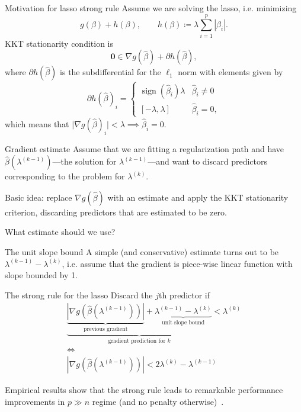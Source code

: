 \documentclass[10pt,ignorenonframetext]{beamer}
\DeclareMathOperator{\sign}{sign}
\begin{document}
\begin{frame}{Motivation for lasso strong rule}
  Assume we are solving the lasso, i.e. minimizing \[g(\beta) + h(\beta), \qquad h(\beta) \coloneqq \lambda \sum_{i=1}^p |\beta_i|.\]
  KKT stationarity condition is \[\boldsymbol{0} \in \nabla g(\hat\beta) + \partial h(\hat\beta),\] where \(\partial h(\hat\beta)\) is the subdifferential for the \(\ell_1\) norm with
  elements given by
  \[
    \partial h(\hat\beta)_i =
    \begin{cases}
      \sign(\hat\beta_i)\lambda & \hat\beta_i \neq 0 \\
      [-\lambda, \lambda]       & \hat\beta_i = 0,
    \end{cases}
  \]
  which means that \(\lvert \nabla g(\hat\beta)_i\rvert < \lambda \implies \hat\beta_i = 0\).
\end{frame}

\begin{frame}{Gradient estimate}
  Assume that we are fitting a regularization \alert{path} and have
  \(\hat\beta(\lambda^{(k-1)})\)---the solution for \(\lambda^{(k-1)}\)---and want
  to discard predictors corresponding to the problem for \(\lambda^{(k)}\).\medskip

  Basic idea: replace \(\nabla g(\hat\beta)\) with an estimate and apply the KKT stationarity
  criterion, discarding predictors that are estimated to be zero.\medskip

  What estimate should we use?\medskip
\end{frame}

\begin{frame}{The unit slope bound}
  A simple (and conservative) estimate turns out to be \(\lambda^{(k-1)} - \lambda^{(k)}\),
  i.e. assume that the gradient is piece-wise linear function with slope bounded by 1.

  \centering
  
\end{frame}

\begin{frame}{The strong rule for the lasso}
  Discard the \(j\)th predictor if
  \[
    \begin{gathered}
      \underbrace{\underbrace{\left| \nabla g\left(\hat\beta(\lambda^{(k-1)})\right) \right|}_\text{previous gradient} + \underbrace{\lambda^{(k-1)} - \lambda^{(k)}}_\text{unit slope bound}}_\text{gradient prediction for \(k\)} < \lambda^{(k)}\\
      \iff\\
      \left| \nabla g\left(\hat\beta(\lambda^{(k-1)})\right) \right| < 2\lambda^{(k)} - \lambda^{(k-1)}
    \end{gathered}
  \]

  Empirical results show that the strong rule leads to remarkable performance improvements in
  \(p \gg n\) regime (and no penalty otherwise)~\autocite{tibshirani2012}.

\end{frame}
\end{document}
